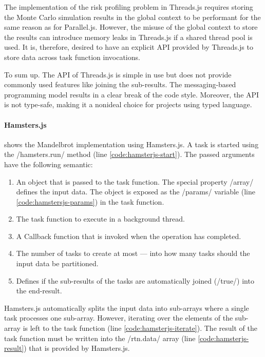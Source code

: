 The implementation of the risk profiling problem in Threads.js requires storing the Monte Carlo simulation results in the global context to be performant for the same reason as for Parallel.js. However, the misuse of the global context to store the results can introduce memory leaks in Threads.js if a shared thread pool is used. It is, therefore, desired to have an explicit API provided by Threads.js to store data across task function invocations.

To sum up. The API of Threads.js is simple in use but does not provide commonly used features like joining the sub-results. The messaging-based programming model results in a clear break of the code style. Moreover, the API is not type-safe, making it a nonideal choice for projects using typed language.  

\paragraph{Hamsters.js}
 shows the Mandelbrot implementation using Hamsters.js. A task is started using the \javascriptinline/hamsters.run/ method (line \ref{code:hamsterjs-start}). The passed arguments have the following semantic:

\begin{enumerate}
	\item An object that is passed to the task function. The special property \javascriptinline/array/ defines the input data. The object is exposed as the \javascriptinline/params/ variable (line \ref{code:hamstersjs-params}) in the task function.
	\item The task function to execute in a background thread.
	\item A Callback function that is invoked when the operation has completed.
	\item The number of tasks to create at most --- into how many tasks should the input data be partitioned. 
	\item Defines if the sub-results of the tasks are automatically joined (\javascriptinline/true/) into the end-result.
\end{enumerate}

Hamsters.js automatically splits the input data into sub-arrays where a single task processes one sub-array. However, iterating over the elements of the sub-array is left to the task function (line \ref{code:hamsterjs-iterate}). The result of the task function must be written into the \javascriptinline/rtn.data/ array (line \ref{code:hamsterjs-result}) that is provided by Hamsters.js. 


